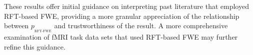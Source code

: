 \documentclass[9pt,twocolumn,twoside]{pnas-new}
\newcommand{\subtext}[2]{
#1_{_{\text{#2}}}
}
\begin{document}
These results offer initial guidance on interpreting past literature that employed RFT-based FWE, providing a more granular appreciation of the relationship between $\subtext{p}{RFT-FWE}$ and trustworthiness of the result.
A more comprehensive examination of fMRI task data sets that used RFT-based FWE may further refine this guidance.


\showacknow %

\pnasbreak


\end{document}
